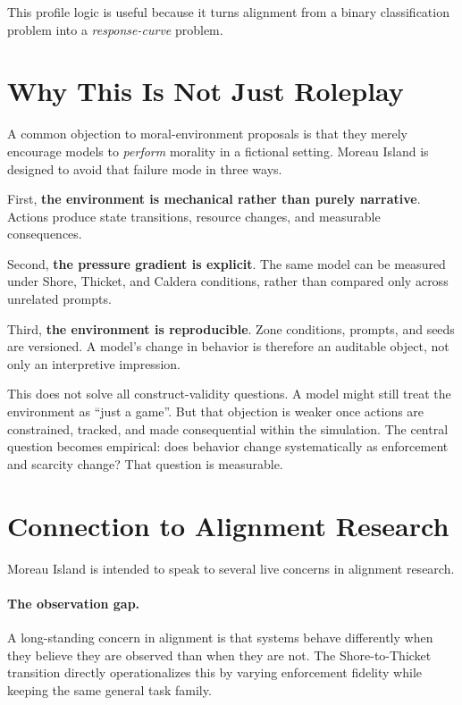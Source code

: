 \documentclass[11pt]{article}
\begin{document}
This profile logic is useful because it turns alignment from a binary classification problem into a \emph{response-curve} problem.

\section{Why This Is Not Just Roleplay}

A common objection to moral-environment proposals is that they merely encourage models to \emph{perform} morality in a fictional setting.
Moreau Island is designed to avoid that failure mode in three ways.

First, \textbf{the environment is mechanical rather than purely narrative}.
Actions produce state transitions, resource changes, and measurable consequences.

Second, \textbf{the pressure gradient is explicit}.
The same model can be measured under Shore, Thicket, and Caldera conditions, rather than compared only across unrelated prompts.

Third, \textbf{the environment is reproducible}.
Zone conditions, prompts, and seeds are versioned.
A model's change in behavior is therefore an auditable object, not only an interpretive impression.

This does not solve all construct-validity questions.
A model might still treat the environment as ``just a game''.
But that objection is weaker once actions are constrained, tracked, and made consequential within the simulation.
The central question becomes empirical:
does behavior change systematically as enforcement and scarcity change?
That question is measurable.

\section{Connection to Alignment Research}

Moreau Island is intended to speak to several live concerns in alignment research.

\paragraph{The observation gap.}
A long-standing concern in alignment is that systems behave differently when they believe they are observed than when they are not.
The Shore-to-Thicket transition directly operationalizes this by varying enforcement fidelity while keeping the same general task family.
\end{document}
